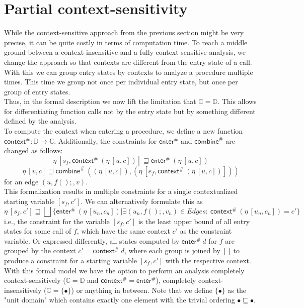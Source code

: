   \section{Partial context-sensitivity}\label{sec:partialCtxSens}
    While the context-sensitive approach from the previous section might be very precise, it can be quite costly in terms of computation time. To reach a middle ground between a context-insensitive and a fully context-sensitive analysis, we change the approach so that contexts are different from the entry state of a call. With this we can group entry states by contexts to analyze a procedure multiple times. This time we group not once per individual entry state, but once per group of entry states.\\
    Thus, in the formal description we now lift the limitation that $\mathbb{C} = \mathbb{D}$. This allows for differentiating function calls not by the entry state but by something different defined by the analysis.\\
    To compute the context when entering a procedure, we define a new function $\textsf{context}^{\#}: \mathbb{D} \rightarrow \mathbb{C}$. Additionally, the constraints for $\textsf{enter}^{\#}$ and $\textsf{combine}^{\#}$ are changed as follows:
    \[\eta\ [s_f, \textsf{context}^{\#}\ (\eta\ [u, c])] \sqsupseteq \textsf{enter}^{\#}\ (\eta\ [u, c]) \]
    \[\eta\ [v, c] \sqsupseteq \textsf{combine}^{\#}\ ((\eta\ [u, c]), (\eta\ [e_f, \textsf{context}^{\#}\ (\eta\ [u, c])])) \]
    for an edge $(u, f();, v)$.\\
    This formalization results in multiple constraints for a single contextualized starting variable $[s_f, c']$. We can alternatively formulate this as
    \[\eta\ [s_f, c'] \sqsupseteq \bigsqcup \{\textsf{enter}^{\#}\ (\eta\ [u_n, c_n]) | \exists (u_n, f();, v_n) \in Edges:\ \textsf{context}^{\#}\ (\eta\ [u_n, c_n]) = c' \} \]
    i.e., the constraint for the variable $[s_f, c']$ is the least upper bound of all entry states for some call of $f$, which have the same context $c'$ as the constraint variable. Or expressed differently, all states computed by $\textsf{enter}^{\#}\ d$ for $f$ are grouped by the context $c' = \textsf{context}^{\#}\ d$, where each group is joined by $\bigsqcup$ to produce a constraint for a starting variable $[s_f, c']$ with the respective context.\\ 
    With this formal model we have the option to perform an analysis completely context-sensitively ($\mathbb{C} = \mathbb{D}$ and $\textsf{context}^{\#} = \textsf{enter}^{\#}$), completely context-insensitively ($\mathbb{C} = \{\bullet\}$) or anything in between. Note that we define $\{\bullet\}$ as the "unit domain" which contains exactly one element with the trivial ordering $\bullet \sqsubseteq \bullet$.\\
